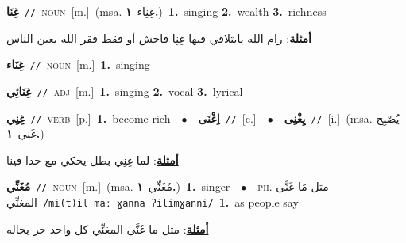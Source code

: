 \documentclass[10pt,a4paper,twoside]{article} %
\begin{document}
\begin{multicols}{2}
{\setlength\topsep{0pt}\textbf{\foreignlanguage{arabic}{غِنَا}}\ {\color{gray}\texttt{//}\color{black}}\ \textsc{noun}\ [m.]\ \color{gray}(msa. \foreignlanguage{arabic}{غِنِاء}~\foreignlanguage{arabic}{\textbf{١.}})\color{black}\ \textbf{1.}~singing  \textbf{2.}~wealth  \textbf{3.}~richness\  \begin{flushright}\color{gray}\foreignlanguage{arabic}{\textbf{\underline{\foreignlanguage{arabic}{أمثلة}}}: رام الله يابتلاقي فيها غِنِا فاحش أو فقط فقر الله يعين الناس}\end{flushright}\color{black}} \vspace{2mm}

{\setlength\topsep{0pt}\textbf{\foreignlanguage{arabic}{غِنَاء}}\ {\color{gray}\texttt{//}\color{black}}\ \textsc{noun}\ [m.]\ \textbf{1.}~singing\ } \vspace{2mm}

{\setlength\topsep{0pt}\textbf{\foreignlanguage{arabic}{غِنَائِي}}\ {\color{gray}\texttt{//}\color{black}}\ \textsc{adj}\ [m.]\ \textbf{1.}~singing  \textbf{2.}~vocal  \textbf{3.}~lyrical\ } \vspace{2mm}

{\setlength\topsep{0pt}\textbf{\foreignlanguage{arabic}{غِنِي}}\ {\color{gray}\texttt{//}\color{black}}\ \textsc{verb}\ [p.]\ \textbf{1.}~become rich\ \ $\bullet$\ \ \setlength\topsep{0pt}\textbf{\foreignlanguage{arabic}{اِغْنَى}}\ {\color{gray}\texttt{//}\color{black}}\ [c.]\ \ $\bullet$\ \ \setlength\topsep{0pt}\textbf{\foreignlanguage{arabic}{يِغْنِى}}\ {\color{gray}\texttt{//}\color{black}}\ [i.]\ \color{gray}(msa. \foreignlanguage{arabic}{يُصْبِح غَني}~\foreignlanguage{arabic}{\textbf{١.}})\color{black}\  \begin{flushright}\color{gray}\foreignlanguage{arabic}{\textbf{\underline{\foreignlanguage{arabic}{أمثلة}}}: لما غِنِي بطل يحكي مع حدا فينا}\end{flushright}\color{black}} \vspace{2mm}

{\setlength\topsep{0pt}\textbf{\foreignlanguage{arabic}{مُغَنِّي}}\ {\color{gray}\texttt{//}\color{black}}\ \textsc{noun}\ [m.]\ \color{gray}(msa. \foreignlanguage{arabic}{مُغَنِّي}~\foreignlanguage{arabic}{\textbf{١.}})\color{black}\ \textbf{1.}~singer\ \ $\bullet$\ \ \textsc{ph.} \color{gray} \foreignlanguage{arabic}{مثل مَا غَنَّى المغنِّي}\color{black}\ {\color{gray}\texttt{/{\sffamily mi(t)il maː ɣanna ʔilimɣanni}/}\color{black}}\ \textbf{1.}~as people say\  \begin{flushright}\color{gray}\foreignlanguage{arabic}{\textbf{\underline{\foreignlanguage{arabic}{أمثلة}}}: مثل ما غَنَّى المغنِّي كل واحد حر بحاله}\end{flushright}\color{black}} \vspace{2mm}


\end{multicols}
\end{document}

